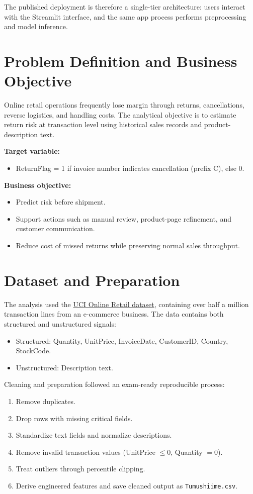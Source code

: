 \documentclass[11pt,a4paper]{article}
\begin{document}
The published deployment is therefore a single-tier architecture: users interact with the Streamlit interface, and the same app process performs preprocessing and model inference.

\section{Problem Definition and Business Objective}
Online retail operations frequently lose margin through returns, cancellations, reverse logistics, and handling costs. The analytical objective is to estimate return risk at transaction level using historical sales records and product-description text.

\textbf{Target variable:}
\begin{itemize}[leftmargin=1.5em]
    \item ReturnFlag = 1 if invoice number indicates cancellation (prefix C), else 0.
\end{itemize}

\textbf{Business objective:}
\begin{itemize}[leftmargin=1.5em]
    \item Predict risk before shipment.
    \item Support actions such as manual review, product-page refinement, and customer communication.
    \item Reduce cost of missed returns while preserving normal sales throughput.
\end{itemize}

\section{Dataset and Preparation}
The analysis used the \href{https://archive.ics.uci.edu/dataset/352/online+retail}{UCI Online Retail dataset}, containing over half a million transaction lines from an e-commerce business. The data contains both structured and unstructured signals:

\begin{itemize}[leftmargin=1.5em]
    \item Structured: Quantity, UnitPrice, InvoiceDate, CustomerID, Country, StockCode.
    \item Unstructured: Description text.
\end{itemize}

Cleaning and preparation followed an exam-ready reproducible process:
\begin{enumerate}[leftmargin=1.7em]
    \item Remove duplicates.
    \item Drop rows with missing critical fields.
    \item Standardize text fields and normalize descriptions.
    \item Remove invalid transaction values (UnitPrice \(\le 0\), Quantity \(= 0\)).
    \item Treat outliers through percentile clipping.
    \item Derive engineered features and save cleaned output as \texttt{Tumushiime.csv}.
\end{enumerate}
\end{document}
